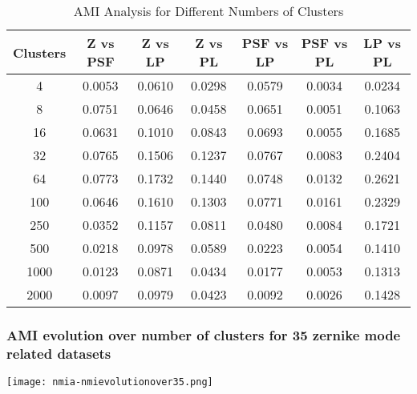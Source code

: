 \begin{table}[h!]
\centering
\begin{tabular}{|c|c|c|c|c|c|c|}
\hline
\textbf{Clusters} & \textbf{Z vs PSF} & \textbf{Z vs LP} & \textbf{Z vs PL} & \textbf{PSF vs LP} & \textbf{PSF vs PL} & \textbf{LP vs PL} \\
\hline
4   & 0.0053 & 0.0610 & 0.0298 & 0.0579 & 0.0034 & 0.0234 \\
8   & 0.0751 & 0.0646 & 0.0458 & 0.0651 & 0.0051 & 0.1063 \\
16  & 0.0631 & 0.1010 & 0.0843 & 0.0693 & 0.0055 & 0.1685 \\
32  & 0.0765 & 0.1506 & 0.1237 & 0.0767 & 0.0083 & 0.2404 \\
64  & 0.0773 & 0.1732 & 0.1440 & 0.0748 & 0.0132 & 0.2621 \\
100 & 0.0646 & 0.1610 & 0.1303 & 0.0771 & 0.0161 & 0.2329 \\
250 & 0.0352 & 0.1157 & 0.0811 & 0.0480 & 0.0084 & 0.1721 \\
500 & 0.0218 & 0.0978 & 0.0589 & 0.0223 & 0.0054 & 0.1410 \\
1000& 0.0123 & 0.0871 & 0.0434 & 0.0177 & 0.0053 & 0.1313 \\
2000& 0.0097 & 0.0979 & 0.0423 & 0.0092 & 0.0026 & 0.1428 \\
\hline
\end{tabular}
\caption{AMI Analysis for Different Numbers of Clusters}
\end{table}
		\FloatBarrier
		
	
	\subsubsection{AMI evolution over number of clusters for 35 zernike mode related datasets}
		\begin{figure*}[ht!]
			\centering
			\texttt{[image: nmia-nmievolutionover35.png]}
		\end{figure*}
		
